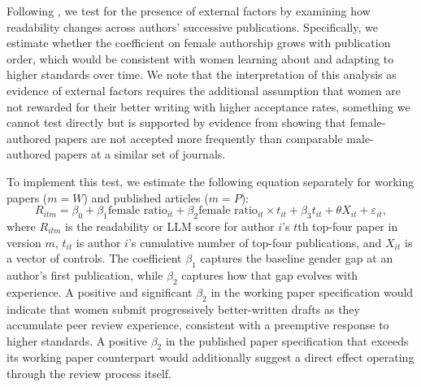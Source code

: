 Following \cite{hengel2022publishing}, we test for the presence of external factors by examining how readability changes across authors' successive publications. Specifically, we estimate whether the coefficient on female authorship grows with publication order, which would be consistent with women learning about and adapting to higher standards over time. We note that the interpretation of this analysis as evidence of external factors requires the additional assumption that women are not rewarded for their better writing with higher acceptance rates, something we cannot test directly but is supported by evidence from \textcite{card2020} showing that female-authored papers are not accepted more frequently than comparable male-authored papers at a similar set of journals. 

To implement this test, we estimate the following equation separately for working papers ($m = W$) and published articles ($m = P$):
\begin{equation}
R_{itm} = \beta_0 + \beta_1 \text{female ratio}_{it} + \beta_2 \text{female ratio}_{it} \times t_{it} + \beta_3 t_{it} + \theta X_{it} + \varepsilon_{it}, \label{eq:exposure}
\end{equation}
where $R_{itm}$ is the readability or LLM score for author $i$'s $t$th top-four paper in version $m$, $t_{it}$ is author $i$'s cumulative number of top-four publications, and $X_{it}$ is a vector of controls. The coefficient $\beta_1$ captures the baseline gender gap at an author's first publication, while $\beta_2$ captures how that gap evolves with experience. A positive and significant $\beta_2$ in the working paper specification would indicate that women submit progressively better-written drafts as they accumulate peer review experience, consistent with a preemptive response to higher standards. A positive $\beta_2$ in the published paper specification that exceeds its working paper counterpart would additionally suggest a direct effect operating through the review process itself.
